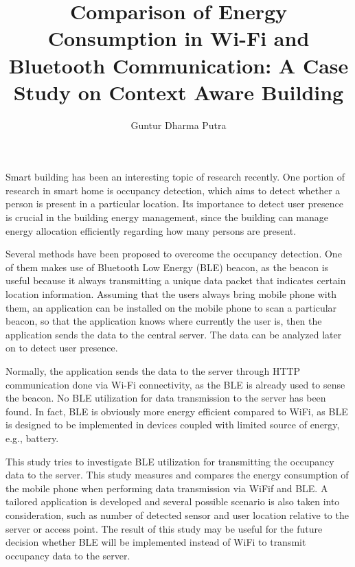 \documentclass[journal]{vgtc}                %
\title{Comparison of Energy Consumption in Wi-Fi and Bluetooth Communication: A Case Study on Context Aware Building}
\author{Guntur Dharma Putra}
\begin{document}


\maketitle
Smart building has been an interesting topic of research recently. One portion of research in smart home is occupancy detection, which aims to detect whether a person is present in a particular location. Its importance to detect user presence is crucial in the building energy management, since the building can manage energy allocation efficiently regarding how many persons are present.

Several methods have been proposed to overcome the occupancy detection. One of them makes use of Bluetooth Low Energy (BLE) beacon, as the beacon is useful because it always transmitting a unique data packet that indicates certain location information. Assuming that the users always bring mobile phone with them, an application can be installed on the mobile phone to scan a particular beacon, so that the application knows where currently the user is, then the application sends the data to the central server. The data can be analyzed later on to detect user presence.

Normally, the application sends the data to the server through HTTP communication done via Wi-Fi connectivity, as the BLE is already used to sense the beacon. No BLE utilization for data transmission to the server has been found. In fact, BLE is obviously more energy efficient compared to WiFi, as BLE is designed to be implemented in devices coupled with limited source of energy, e.g., battery.

This study tries to investigate BLE utilization for transmitting the occupancy data to the server. This study measures and compares the energy consumption of the mobile phone when performing data transmission via WiFif and BLE. A tailored application is developed and several possible scenario is also taken into consideration, such as number of detected sensor and user location relative to the server or access point. The result of this study may be useful for the future decision whether BLE will be implemented instead of WiFi to transmit occupancy data to the server.
\end{document}
